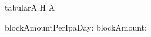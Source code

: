 \documentclass{article}
\begin{document}
\begin{table}[]
\begin{Timetable}{tabular}{A H A}
\end{Timetable}
\end{table}
blockAmountPerIpaDay: \blockAmountPerIpaDay
blockAmount: \blockAmount
\end{document}
